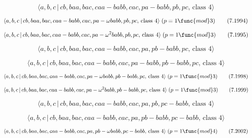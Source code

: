 \documentclass[10pt]{article}
\begin{document}
\begin{equation}
\langle a,b,c\,|\,cb,baa,bac,caa-babb,cac,pa-babb,pb,pc,\,\text{class }%
4\rangle  \tag{7.1993}
\end{equation}

\begin{equation}
\langle a,b,c\,|\,cb,baa,bac,caa-babb,cac,pa-\omega babb,pb,pc,\,\text{class 
}4\rangle \;(p=1\func{mod}3)  \tag{7.1994}
\end{equation}

\begin{equation}
\langle a,b,c\,|\,cb,baa,bac,caa-babb,cac,pa-\omega ^{2}babb,pb,pc,\,\text{%
class }4\rangle \;(p=1\func{mod}3)  \tag{7.1995}
\end{equation}

\begin{equation}
\langle a,b,c\,|\,cb,baa,bac,caa-babb,cac,pa,pb-babb,pc,\,\text{class }%
4\rangle  \tag{7.1996}
\end{equation}

\begin{equation}
\langle a,b,c\,|\,cb,baa,bac,caa-babb,cac,pa-babb,pb-babb,pc,\,\text{class }%
4\rangle  \tag{7.1997}
\end{equation}

\begin{equation}
\langle a,b,c\,|\,cb,baa,bac,caa-babb,cac,pa-\omega babb,pb-babb,pc,\,\text{%
class }4\rangle \;(p=1\func{mod}3)  \tag{7.1998}
\end{equation}

\begin{equation}
\langle a,b,c\,|\,cb,baa,bac,caa-babb,cac,pa-\omega ^{2}babb,pb-babb,pc,\,%
\text{class }4\rangle \;(p=1\func{mod}3)  \tag{7.1999}
\end{equation}

\begin{equation}
\langle a,b,c\,|\,cb,baa,bac,caa-babb,cac,pa,pb,pc-babb,\,\text{class }%
4\rangle  \tag{7.2000}
\end{equation}

\begin{equation}
\langle a,b,c\,|\,cb,baa,bac,caa-babb,cac,pa,pb-babb,pc-babb,\,\text{class }%
4\rangle  \tag{7.2001}
\end{equation}

\begin{equation}
\langle a,b,c\,|\,cb,baa,bac,caa-babb,cac,pa,pb-\omega babb,pc-babb,\,\text{%
class }4\rangle \;(p=1\func{mod}4)  \tag{7.2002}
\end{equation}
\end{document}
